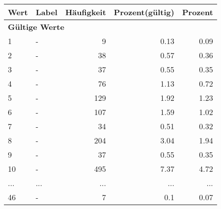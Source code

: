      \begin{longtable}{lXrrr}
     \toprule
     \textbf{Wert} & \textbf{Label} & \textbf{Häufigkeit} & \textbf{Prozent(gültig)} & \textbf{Prozent} \\
     \endhead
     \midrule
     \multicolumn{5}{l}{\textbf{Gültige Werte}}\\
        1 & \multicolumn{1}{X}{-} & %
          \num{9} &
          \num[round-mode=places,round-precision=2]{0.13} &
          \num[round-mode=places,round-precision=2]{0.09} \\
        2 & \multicolumn{1}{X}{-} & %
          \num{38} &
          \num[round-mode=places,round-precision=2]{0.57} &
          \num[round-mode=places,round-precision=2]{0.36} \\
        3 & \multicolumn{1}{X}{-} & %
          \num{37} &
          \num[round-mode=places,round-precision=2]{0.55} &
          \num[round-mode=places,round-precision=2]{0.35} \\
        4 & \multicolumn{1}{X}{-} & %
          \num{76} &
          \num[round-mode=places,round-precision=2]{1.13} &
          \num[round-mode=places,round-precision=2]{0.72} \\
        5 & \multicolumn{1}{X}{-} & %
          \num{129} &
          \num[round-mode=places,round-precision=2]{1.92} &
          \num[round-mode=places,round-precision=2]{1.23} \\
        6 & \multicolumn{1}{X}{-} & %
          \num{107} &
          \num[round-mode=places,round-precision=2]{1.59} &
          \num[round-mode=places,round-precision=2]{1.02} \\
        7 & \multicolumn{1}{X}{-} & %
          \num{34} &
          \num[round-mode=places,round-precision=2]{0.51} &
          \num[round-mode=places,round-precision=2]{0.32} \\
        8 & \multicolumn{1}{X}{-} & %
          \num{204} &
          \num[round-mode=places,round-precision=2]{3.04} &
          \num[round-mode=places,round-precision=2]{1.94} \\
        9 & \multicolumn{1}{X}{-} & %
          \num{37} &
          \num[round-mode=places,round-precision=2]{0.55} &
          \num[round-mode=places,round-precision=2]{0.35} \\
        10 & \multicolumn{1}{X}{-} & %
          \num{495} &
          \num[round-mode=places,round-precision=2]{7.37} &
          \num[round-mode=places,round-precision=2]{4.72} \\
       ... & ... & ... & ... & ... \\
        46 & \multicolumn{1}{X}{-} & %
          \num{7} &
          \num[round-mode=places,round-precision=2]{0.1} &
          \num[round-mode=places,round-precision=2]{0.07} \\


\end{longtable}

